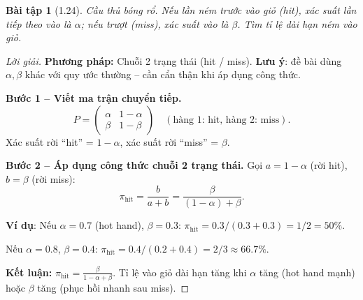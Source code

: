 \documentclass[8pt,a4paper]{article}
\newtheorem{exercise}{Bài tập}
\newenvironment{solution}{\begin{proof}[Lời giải]}{\end{proof}}
\begin{document}
\begin{exercise}[1.24]
Cầu thủ bóng rổ. Nếu lần ném trước vào giỏ (hit), xác suất lần tiếp theo vào là $\alpha$; nếu trượt (miss), xác suất vào là $\beta$. Tìm tỉ lệ dài hạn ném vào giỏ.
\end{exercise}
\begin{solution}
\textbf{Phương pháp:} Chuỗi 2 trạng thái (hit / miss). \textbf{Lưu ý}: đề bài dùng $\alpha, \beta$ khác với quy ước thường -- cần cẩn thận khi áp dụng công thức.

\textbf{Bước 1 -- Viết ma trận chuyển tiếp.}
\[
  P = \begin{pmatrix} \alpha & 1-\alpha \\ \beta & 1-\beta \end{pmatrix} \quad (\text{hàng 1: hit, hàng 2: miss}).
\]
Xác suất rời ``hit'' = $1-\alpha$, xác suất rời ``miss'' = $\beta$.

\textbf{Bước 2 -- Áp dụng công thức chuỗi 2 trạng thái.}
Gọi $a = 1-\alpha$ (rời hit), $b = \beta$ (rời miss):
\[
  \pi_{\text{hit}} = \frac{b}{a+b} = \frac{\beta}{(1-\alpha)+\beta}.
\]

\textbf{Ví dụ}: Nếu $\alpha = 0.7$ (hot hand), $\beta = 0.3$: $\pi_{\text{hit}} = 0.3/(0.3+0.3) = 1/2 = 50\%$.

Nếu $\alpha = 0.8$, $\beta = 0.4$: $\pi_{\text{hit}} = 0.4/(0.2+0.4) = 2/3 \approx 66.7\%$.

\textbf{Kết luận:} $\pi_{\text{hit}} = \frac{\beta}{1-\alpha+\beta}$. Tỉ lệ vào giỏ dài hạn tăng khi $\alpha$ tăng (hot hand mạnh) hoặc $\beta$ tăng (phục hồi nhanh sau miss).
\end{solution}
\end{document}
